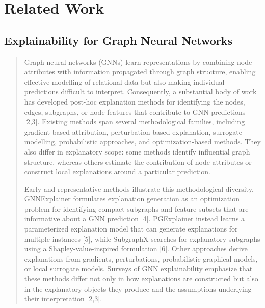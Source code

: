 \documentclass[a4paper]{article}
\begin{document}
\section{\texorpdfstring{Related Work
}{Related Work }}\label{related-work}

\subsection{Explainability for Graph Neural
Networks}\label{explainability-for-graph-neural-networks}

\begin{quote}
Graph neural networks (GNNs) learn representations by combining node
attributes with information propagated through graph structure, enabling
effective modelling of relational data but also making individual
predictions difficult to interpret. Consequently, a substantial body of
work has developed post-hoc explanation methods for identifying the
nodes, edges, subgraphs, or node features that contribute to GNN
predictions {[}2,3{]}. Existing methods span several methodological
families, including gradient-based attribution, perturbation-based
explanation, surrogate modelling, probabilistic approaches, and
optimization-based methods. They also differ in explanatory scope: some
methods identify influential graph structure, whereas others estimate
the contribution of node attributes or construct local explanations
around a particular prediction.

Early and representative methods illustrate this methodological
diversity. GNNExplainer formulates explanation generation as an
optimization problem for identifying compact subgraphs and feature
subsets that are informative about a GNN prediction {[}4{]}. PGExplainer
instead learns a parameterized explanation model that can generate
explanations for multiple instances {[}5{]}, while SubgraphX searches
for explanatory subgraphs using a Shapley-value-inspired formulation
{[}6{]}. Other approaches derive explanations from gradients,
perturbations, probabilistic graphical models, or local surrogate
models. Surveys of GNN explainability emphasize that these methods
differ not only in how explanations are constructed but also in the
explanatory objects they produce and the assumptions underlying their
interpretation {[}2,3{]}.


\end{quote}
\end{document}
